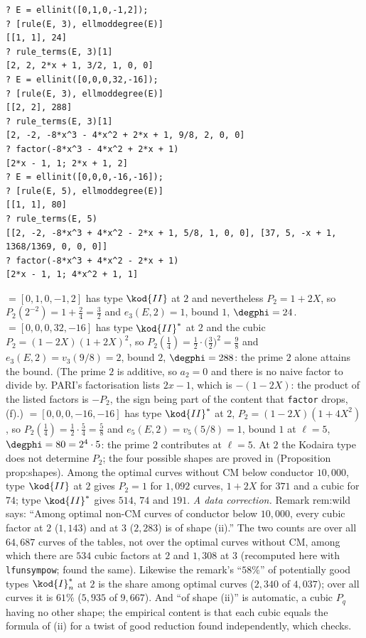 \begin{sloppypar}
\begin{example}\label{ex:computation:wild-two}
\begin{lstlisting}[language=GP]
? E = ellinit([0,1,0,-1,2]);
? [rule(E, 3), ellmoddegree(E)]
[[1, 1], 24]
? rule_terms(E, 3)[1]
[2, 2, 2*x + 1, 3/2, 1, 0, 0]
? E = ellinit([0,0,0,32,-16]);
? [rule(E, 3), ellmoddegree(E)]
[[2, 2], 288]
? rule_terms(E, 3)[1]
[2, -2, -8*x^3 - 4*x^2 + 2*x + 1, 9/8, 2, 0, 0]
? factor(-8*x^3 - 4*x^2 + 2*x + 1)
[2*x - 1, 1; 2*x + 1, 2]
? E = ellinit([0,0,0,-16,-16]);
? [rule(E, 5), ellmoddegree(E)]
[[1, 1], 80]
? rule_terms(E, 5)
[[2, -2, -8*x^3 + 4*x^2 - 2*x + 1, 5/8, 1, 0, 0], [37, 5, -x + 1, 1368/1369, 0, 0, 0]]
? factor(-8*x^3 + 4*x^2 - 2*x + 1)
[2*x - 1, 1; 4*x^2 + 1, 1]
\end{lstlisting}
 $=[0,1,0,-1,2]$ has type $\kod{II}$ at $2$ and nevertheless $P_2=1+2X$, so $P_2(2^{-2})=1+\frac24=\frac32$ and $e_3(E,2)=1$, bound $1$, $\degphi=24$.  $=[0,0,0,32,-16]$ has type $\kod{II}^*$ at
$2$ and the cubic $P_2=(1-2X)(1+2X)^2$, so $P_2(\frac14)=\frac12\cdot\bigl(\frac32\bigr)^2=\frac98$ and $e_3(E,2)=v_3(9/8)=2$, bound $2$, $\degphi=288$: the prime $2$ alone attains the bound. (The prime $2$ is additive, so $a_2=0$ and there is no naive factor to divide by. PARI's factorisation lists $2x-1$, which is $-(1-2X)$:
the product of the listed factors is $-P_2$, the sign being part of the content that \texttt{factor} drops, (f).)  $=[0,0,0,-16,-16]$ has
type $\kod{II}^*$ at $2$, $P_2=(1-2X)(1+4X^2)$, so $P_2(\frac14)=\frac12\cdot\frac54=\frac58$ and $e_5(E,2)=v_5(5/8)=1$, bound $1$ at $\ell=5$, $\degphi=80=2^4\cdot5$: the prime $2$ contributes at $\ell=5$. At $2$ the
Kodaira type does not determine $P_2$; the four possible shapes are proved in  (Proposition prop:shapes). Among the optimal
curves without CM below conductor $10{,}000$, type $\kod{II}$ at $2$ gives $P_2=1$ for $1{,}092$ curves, $1+2X$ for $371$ and a cubic for $74$; type $\kod{II}^*$
gives $514$, $74$ and $191$. \emph{A data correction.} Remark rem:wild says: ``Among optimal non-CM curves of conductor below $10{,}000$, every cubic factor
at $2$ ($1{,}143$) and at $3$ ($2{,}283$) is of shape (ii).'' The two counts are over all $64{,}687$ curves of the tables, not over the optimal curves
without CM, among which there are $534$ cubic factors at $2$ and $1{,}308$ at $3$ (recomputed here with \texttt{lfunsympow};  found the
same). Likewise the remark's ``$58\%$'' of potentially good types $\kod{I}_n^*$ at $2$ is the share among optimal curves ($2{,}340$ of $4{,}037$); over all
curves it is $61\%$ ($5{,}935$ of $9{,}667$). And ``of shape (ii)'' is automatic, a cubic $P_q$ having no other shape; the empirical content is that each
cubic equals the formula of (ii) for a twist of good reduction found independently, which  checks.
\end{example}


\end{sloppypar}
